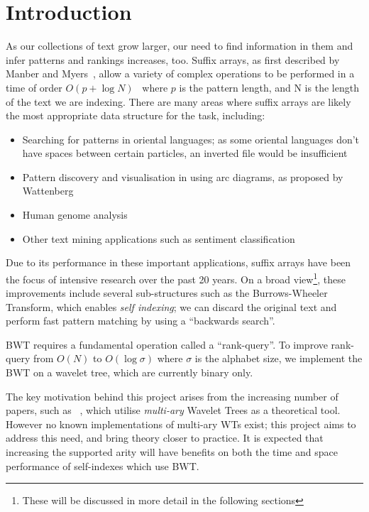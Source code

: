 \section{Introduction}

As our collections of text grow larger, our need to find information in them
and infer patterns and rankings increases, too. Suffix arrays, as first
described by Manber and Myers~\cite{manber1990}, allow a variety of complex
operations to be performed in a time of order $O(p + \log N)$~\cite{manber1990}
where $p$ is the pattern length, and N is the length of the text we are
indexing. There are many areas where suffix arrays are likely the most
appropriate data structure for the task, including:

\begin{itemize}
\item
	Searching for patterns in oriental languages; as some oriental languages
    don't have spaces between certain particles, an inverted file would be
    insufficient
\item
	Pattern discovery and visualisation in using arc diagrams, as proposed by
    Wattenberg~\cite{arc:wattenberg2002}
\item
	Human genome analysis~\cite{genome:abouelhoda2004, genome:flicek2009}
\item
	Other text mining applications such as sentiment classification
\end{itemize}

Due to its performance in these important applications, suffix arrays have been
the focus of intensive research over the past 20 years. On a broad
view\footnote{These will be discussed in more detail in the following sections},
these improvements include several sub-structures such as the Burrows-Wheeler
Transform, which enables \emph{self indexing}; we can discard the original text
and perform fast pattern matching by using a ``backwards search''.

BWT requires a fundamental operation called a ``rank-query''. To improve 
rank-query from $O(N)$ to $O(\log \sigma)$ where $\sigma$ is the alphabet size, we
implement the BWT on a wavelet tree, which are currently binary only. 

The key motivation behind this project arises from the increasing number of
papers, such as ~\cite{yu2009}, which utilise \emph{multi-ary} Wavelet
Trees as a theoretical tool. However no known implementations of multi-ary WTs
exist; this project aims to address this need, and bring theory closer to
practice. It is expected that increasing the supported arity will have benefits
on both the time and space performance of self-indexes which use BWT.

